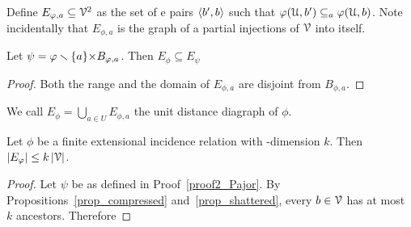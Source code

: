 \documentclass[sputnik.tex]{subfiles}
\begin{document}
Define $E_{\varphi,a}\subseteq\EuScript V^2$ as the set of e pairs $\langle b',b\rangle$ such that $\varphi(\EuScript U,b')\subseteq_a\varphi(\EuScript U,b)$. 
Note incidentally that $E_{\phi,a}$ is the graph of a partial injections of $\EuScript V$ into itself. 

\begin{proposition}\label{prop_udd1} 
Let $\psi=\varphi\smallsetminus\{a\}{\times}B_{\varphi,a}$. Then $E_\phi\subseteq E_{\psi}$
\end{proposition}
\begin{proof}Both the range and the domain of $E_{\phi,a}$ are disjoint from $B_{\phi,a}$.
\end{proof}

We call $\displaystyle E_\phi=\bigcup_{a\in U}E_{\phi,a}$ the unit distance diagraph of $\phi$. 

\begin{proposition}
Let $\phi$ be a finite extensional incidence relation with \vc-dimension $k$.
Then $|E_\varphi|\le k\,|\EuScript V|$.
\end{proposition}

\begin{proof}
Let $\psi$ be as defined in Proof~\ref{proof2_Pajor}.
By Propositions~\ref{prop_compressed} and~\ref{prop_shattered}, every $b\in\EuScript V$ has at most $k$ ancestors.
Therefore

\end{proof}
\end{document}
